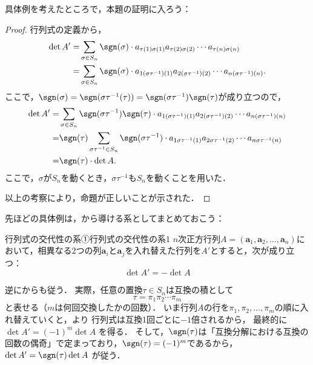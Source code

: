 具体例を考えたところで，本題の証明に入ろう：

\begin{leftbar}
  \begin{proof}
    行列式の定義から，
    \begin{align*} 
      \det A ' = & \sum_{\sigma \in S_n} \sgn(\sigma) \cdot a_{\tau(1)\sigma(1)} a_{\tau(2)\sigma(2)} \dotsm a_{\tau(n)\sigma(n)} \\
      = & \sum_{\sigma \in S_n} \sgn(\sigma) \cdot a_{1(\sigma  \tau^{-1})(1)} a_{2(\sigma  \tau^{-1})(2)} \dotsm a_{n(\sigma  \tau^{-1})(n)}.
    \end{align*} 
    ここで，$\sgn (\sigma) = \sgn (\sigma \tau^{-1} (\tau))= \sgn (\sigma \tau^{-1}) \sgn (\tau)$が成り立つので，
    \begin{align*} 
      \det A ' = & \sum_{\sigma \in S_n} \sgn(\sigma  \tau^{-1}) \sgn (\tau) \cdot a_{1(\sigma  \tau^{-1})(1)} a_{2(\sigma  \tau^{-1})(2)} \dotsm a_{n(\sigma  \tau^{-1})(n)} \\
      = & \sgn (\tau) \sum_{\sigma \tau^{-1} \in S_n} \sgn(\sigma \tau ^{-1}) \cdot a_{1\sigma \tau^{-1}(1)} a_{2\sigma \tau^{-1}(2)} \dotsm a_{n\sigma \tau^{-1}(n)} \\
      = & \sgn (\tau) \cdot \det A.
    \end{align*}
    ここで，$\sigma$が$S_n$を動くとき，$\sigma \tau^{-1}$も$S_n$を動くことを用いた．

    以上の考察により，命題が正しいことが示された．
  \end{proof}
  \end{leftbar}

  先ほどの具体例は，から導ける系としてまとめておこう：

  \begin{cor}{行列式の交代性の系①}{行列式の交代性の系1}
    $n$次正方行列$A = (\bm{a}_1, \bm{a}_2, \dots, \bm{a}_n)$において，相異なる$2$つの列$\bm{a}_i$と$\bm{a}_j$を入れ替えた行列を$A'$とすると，次が成り立つ：
    \[
    \det A' = - \det A
    \]
  \end{cor}

  逆にからも従う．
  実際，任意の置換$\tau\in S_n$は互換の積として
  \[
  \tau=\pi_1\pi_2\cdots\pi_m
  \]
  と表せる（$m$は何回交換したかの回数）．
  いま行列$A$の行を$\pi_1,\pi_2,\dots,\pi_m$の順に入れ替えていくと，より
  行列式は互換1回ごとに$-1$倍されるから，
  最終的に $\det A' = (-1)^m \det A$ を得る．
  そして，$\sgn(\tau)$は「互換分解における互換の回数の偶奇」で定まっており，$\sgn(\tau)=(-1)^m$であるから，
  $\det A'=\sgn(\tau)\det A$ が従う．

